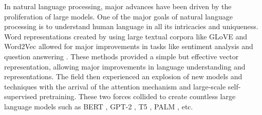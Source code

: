 In natural language processing, major advances have been driven by the proliferation of large models. One of the major goals of natural language processing is to understand human language in all its intricacies and uniqueness. Word representations created by using large textual corpora like GLoVE \cite{Pennington2014GloVeGV} and Word2Vec \cite{Mikolov2013DistributedRO} allowed for major improvements in tasks like sentiment analysis \cite{Socher2013RecursiveDM} and question answering \cite{Rajpurkar2016SQuAD1Q} \cite{Seo2017BidirectionalAF}. These methods provided a simple but effective vector representation, allowing major improvements in language understanding and representations. The field then experienced an explosion of new models and techniques with the arrival of the attention mechanism and large-scale self-supervised pretraining. These two forces collided to create countless large language models such as BERT \cite{Devlin2019BERTPO}, GPT-2 \cite{Radford2019LanguageMA}, T5 \cite{Raffel2020ExploringTL}, PALM \cite{Bi2020PALMPA}, etc.
